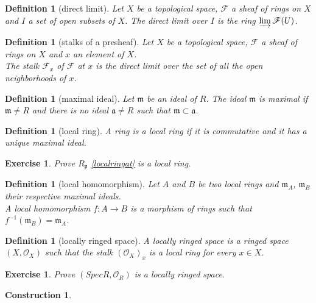 \documentclass[12pt]{article}
\newtheorem{definition}[proposition]{Definition}
\newtheorem{ex}[proposition]{Exercise}
\newtheorem{cons}[proposition]{Construction}
\begin{document}
\begin{definition}[direct limit]
	Let $X$ be a topological space, $\mathscr{F}$ a sheaf of rings on $X$ and $I$ a set of open subsets of $X$. The direct limit over $I$ is the ring $\varinjlim \mathscr{F}(U)$.
\end{definition}

\begin{definition}[stalks of a presheaf]
	Let $X$ be a topological space, $\mathscr{F}$ a sheaf of rings on $X$ and $x$ an element of $X$. \\
	The stalk $\mathscr{F}_x$ of $\mathscr{F}$ at $x$ is the direct limit over the set of all the open neighborhoods of $x$.   
\end{definition}

\begin{definition}[maximal ideal]
	Let $\mathfrak{m}$ be an ideal of $R$. The ideal $\mathfrak{m}$ is maximal if $\mathfrak{m} \neq R$ and there is no ideal $\mathfrak{a} \neq R$ such that $\mathfrak{m} \subset \mathfrak{a}$.
\end{definition}

\begin{definition}[local ring]
	A ring is a local ring if it is commutative and it has a unique maximal ideal. 	
\end{definition}

\begin{ex}
	Prove $R_{\mathfrak{p}}$ \ref{localringat} is a local ring.
\end{ex}

\begin{definition}[local homomorphism]
	Let $A$ and $B$ be two local rings and $\mathfrak{m}_A$, $\mathfrak{m}_B$ their respective maximal ideals. \\
	A local homomorphism $f: A \rightarrow B$ is a morphism of rings such that $f^{-1} (\mathfrak{m}_B) = \mathfrak{m}_A$. 
\end{definition}		

\begin{definition}[locally ringed space]
	A locally ringed space is a ringed space $(X, \mathscr{O}_X)$ such that the stalk $(\mathscr{O}_X)_x$ is a local ring for every $x \in X$.
\end{definition}

\begin{ex}
	Prove $(Spec R, \mathscr{O}_R)$ is a locally ringed space.
\end{ex}

\begin{cons}
	
\end{cons}	
				
\end{document}
